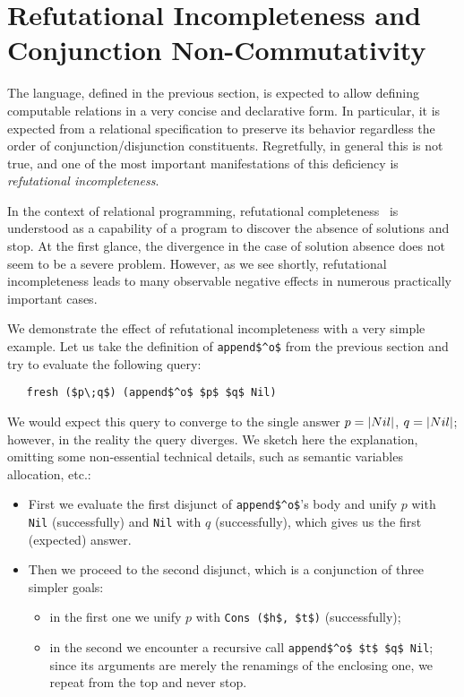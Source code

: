 \section{Refutational Incompleteness and Conjunction Non-Commutativity}
\label{incompleteness}

The language, defined in the previous section, is expected to allow defining computable relations in a 
very concise and declarative form. In particular, it is expected from a relational 
specification to preserve its behavior regardless the order of conjunction/disjunction 
constituents. Regretfully, in general this is not true, and one of the most important
manifestations of this deficiency is \emph{refutational incompleteness}.  

In the context of relational programming, refutational completeness~\cite{WillThesis} is understood as 
a capability of a program to discover the absence of solutions and stop. At the first glance,
the divergence in the case of solution absence does not seem to be a severe problem. However, as
we see shortly, refutational incompleteness leads to many observable negative effects in numerous
practically important cases. 

We demonstrate the effect of refutational incompleteness with a very simple example. Let us take the
definition of \lstinline{append$^o$} from the previous section and try to evaluate the following query:

\begin{lstlisting}
   fresh ($p\;q$) (append$^o$ $p$ $q$ Nil)
\end{lstlisting}

We would expect this query to converge to the single answer \mbox{$p=\lstinline|Nil|$}, \mbox{$q=\lstinline|Nil|$};
however, in the reality the query diverges. We sketch here the explanation, omitting some non-essential technical
details, such as semantic variables allocation, etc.:

\begin{itemize}
\item First we evaluate the first disjunct of \lstinline|append$^o$|'s body and unify $p$ with \lstinline|Nil| (successfully)
and \lstinline|Nil| with $q$ (successfully), which gives us the first (expected) answer.

\item Then we proceed to the second disjunct, which is a conjunction of three simpler goals:

  \begin{itemize} 
     \item in the first one we unify $p$ with \lstinline|Cons ($h$, $t$)| (successfully);
     \item in the second we encounter a recursive call \lstinline|append$^o$ $t$ $q$ Nil|; since its arguments are merely the renamings of the enclosing one, we repeat from the top and never stop.
  \end{itemize} 
\end{itemize}


